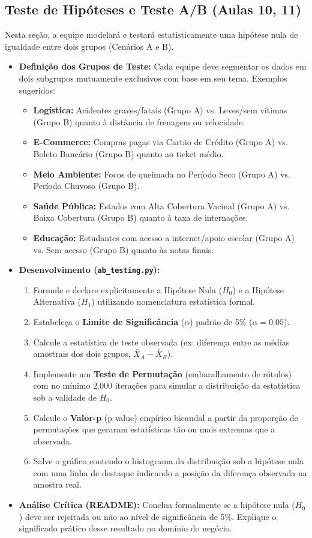 \documentclass[12pt,a4paper]{article}
\begin{document}
	\subsection{Teste de Hipóteses e Teste A/B (Aulas 10, 11)}
	Nesta seção, a equipe modelará e testará estatisticamente uma hipótese nula de igualdade entre dois grupos (Cenários A e B).
	\begin{itemize}
		\item \textbf{Definição dos Grupos de Teste:} Cada equipe deve segmentar os dados em dois subgrupos mutuamente exclusivos com base em seu tema. Exemplos sugeridos:
		\begin{itemize}
			\item \textbf{Logística:} Acidentes graves/fatais (Grupo A) vs. Leves/sem vítimas (Grupo B) quanto à distância de frenagem ou velocidade.
			\item \textbf{E-Commerce:} Compras pagas via Cartão de Crédito (Grupo A) vs. Boleto Bancário (Grupo B) quanto ao ticket médio.
			\item \textbf{Meio Ambiente:} Focos de queimada no Período Seco (Grupo A) vs. Período Chuvoso (Grupo B).
			\item \textbf{Saúde Pública:} Estados com Alta Cobertura Vacinal (Grupo A) vs. Baixa Cobertura (Grupo B) quanto à taxa de internações.
			\item \textbf{Educação:} Estudantes com acesso a internet/apoio escolar (Grupo A) vs. Sem acesso (Grupo B) quanto às notas finais.
		\end{itemize}
		
		\item \textbf{Desenvolvimento (\texttt{ab\_testing.py}):}
		\begin{enumerate}
			\item Formule e declare explicitamente a Hipótese Nula ($H_0$) e a Hipótese Alternativa ($H_1$) utilizando nomenclatura estatística formal.
			\item Estabeleça o \textbf{Limite de Significância} ($\alpha$) padrão de 5\% ($\alpha = 0.05$).
			\item Calcule a estatística de teste observada (ex: diferença entre as médias amostrais dos dois grupos, $\bar{X}_A - \bar{X}_B$).
			\item Implemente um \textbf{Teste de Permutação} (embaralhamento de rótulos) com no mínimo $2.000$ iterações para simular a distribuição da estatística sob a validade de $H_0$.
			\item Calcule o \textbf{Valor-p} (p-value) empírico bicaudal a partir da proporção de permutações que geraram estatísticas tão ou mais extremas que a observada.
			\item Salve o gráfico contendo o histograma da distribuição sob a hipótese nula com uma linha de destaque indicando a posição da diferença observada na amostra real.
		\end{enumerate}
		\item \textbf{Análise Crítica (README):} Conclua formalmente se a hipótese nula ($H_0$) deve ser rejeitada ou não ao nível de significância de 5\%. Explique o significado prático desse resultado no domínio do negócio.
	\end{itemize}
	
\end{document}
